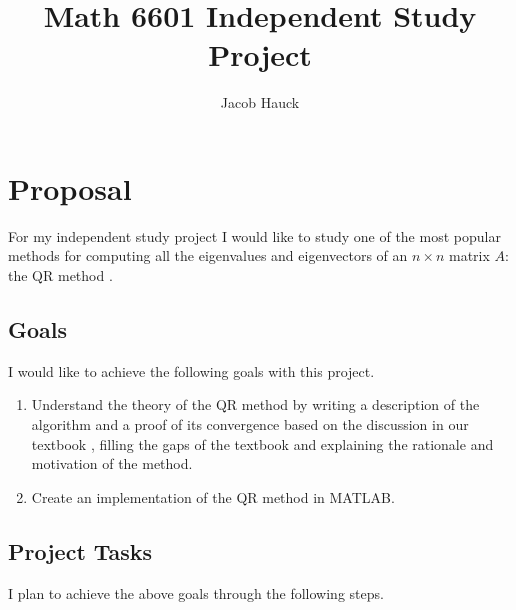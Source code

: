 \documentclass{article}
\title{Math 6601 Independent Study Project}
\author{Jacob Hauck}
\begin{document}
\maketitle
	
\section*{Proposal}

For my independent study project I would like to study one of the most popular methods for computing all the eigenvalues and eigenvectors of an $n\times n$ matrix $A$: the QR method \cite{ackleh_2009}.

\subsection*{Goals}
I would like to achieve the following goals with this project.
\begin{enumerate}
	\item Understand the theory of the QR method by writing a description of the algorithm and a proof of its convergence based on the discussion in our textbook \cite{ackleh_2009}, filling the gaps of the textbook and explaining the rationale and motivation of the method.
	
	\item Create an implementation of the QR method in MATLAB.
\end{enumerate}

\subsection*{Project Tasks}
I plan to achieve the above goals through the following steps.
\end{document}
